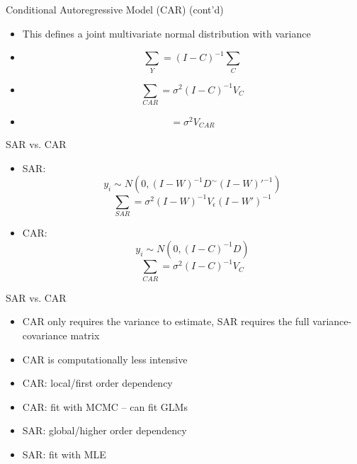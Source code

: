 \documentclass[aspectratio = 169, 12pt]{beamer}\usepackage[]{graphicx}\usepackage[]{color}
\begin{document}
\begin{frame}{Conditional Autoregressive Model (CAR) (cont'd)}
\begin{itemize}
\item This defines a joint multivariate normal distribution with variance
\item $$ \sum_Y = (I - C)^{-1} \sum_{C} $$
\item $$ \sum_{CAR} = \sigma^{2} (I - C)^{-1} V_{C} $$
\item $$ = \sigma^{2}V_{CAR} $$
\end{itemize}
\end{frame}


\begin{frame}{SAR vs. CAR}
\begin{itemize}
\item SAR: $$ y_i \sim N(0, (I-W)^{-1} D^{\sim} (I-W)'^{-1}) $$
 $$ \sum_{SAR} = \sigma^{2} (I - W)^{-1} V_{\epsilon} (I - W')^{-1} $$
\item CAR: $$ y_i \sim N(0, (I-C)^{-1} D )$$
 $$ \sum_{CAR} = \sigma^{2} (I - C)^{-1} V_{C} $$
\end{itemize}
\end{frame}


\begin{frame}{SAR vs. CAR}
\begin{itemize}
\item CAR only requires the variance to estimate, SAR requires the full variance-covariance matrix
\item CAR is computationally less intensive
\item CAR: local/first order dependency
\item CAR: fit with MCMC -- can fit GLMs
\item SAR: global/higher order dependency
\item SAR: fit with MLE
\end{itemize}
\end{frame}
\end{document}
